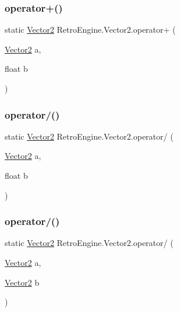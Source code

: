 \subsubsection{\texorpdfstring{operator+()}{operator+()}\hspace{0.1cm}{\footnotesize\ttfamily [2/2]}}
{\footnotesize\ttfamily static \mbox{\hyperlink{struct_retro_engine_1_1_vector2}{Vector2}} Retro\+Engine.\+Vector2.\+operator+ (\begin{DoxyParamCaption}\item[{\mbox{\hyperlink{struct_retro_engine_1_1_vector2}{Vector2}}}]{a,  }\item[{float}]{b }\end{DoxyParamCaption})\hspace{0.3cm}{\ttfamily [static]}}

\mbox{\label{struct_retro_engine_1_1_vector2_a884af5063ecb002a8c508320b37591e7}} 
\subsubsection{\texorpdfstring{operator/()}{operator/()}\hspace{0.1cm}{\footnotesize\ttfamily [1/2]}}
{\footnotesize\ttfamily static \mbox{\hyperlink{struct_retro_engine_1_1_vector2}{Vector2}} Retro\+Engine.\+Vector2.\+operator/ (\begin{DoxyParamCaption}\item[{\mbox{\hyperlink{struct_retro_engine_1_1_vector2}{Vector2}}}]{a,  }\item[{float}]{b }\end{DoxyParamCaption})\hspace{0.3cm}{\ttfamily [static]}}

\mbox{\label{struct_retro_engine_1_1_vector2_ae1d1b9fdd7d02480622857a50e715ffc}} 
\subsubsection{\texorpdfstring{operator/()}{operator/()}\hspace{0.1cm}{\footnotesize\ttfamily [2/2]}}
{\footnotesize\ttfamily static \mbox{\hyperlink{struct_retro_engine_1_1_vector2}{Vector2}} Retro\+Engine.\+Vector2.\+operator/ (\begin{DoxyParamCaption}\item[{\mbox{\hyperlink{struct_retro_engine_1_1_vector2}{Vector2}}}]{a,  }\item[{\mbox{\hyperlink{struct_retro_engine_1_1_vector2}{Vector2}}}]{b }\end{DoxyParamCaption})\hspace{0.3cm}{\ttfamily [static]}}

